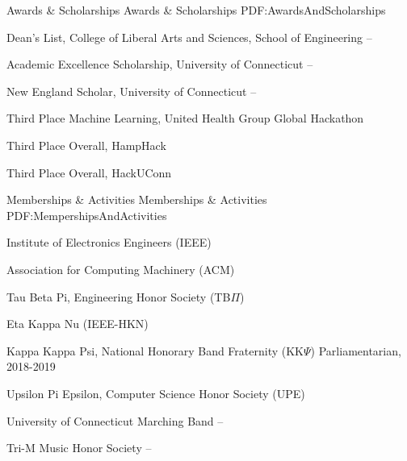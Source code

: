 \documentclass[letterpaper,MMMyyyy,nonstopmode]{simpleresumecv}
\begin{document}
\begin{Body}
\Section
{Awards \&\newline
Scholarships}
{Awards \& Scholarships}
{PDF:AwardsAndScholarships}

\BulletItem
Dean's List,
College of Liberal Arts and Sciences, School of Engineering
\hfill
{} --

\Gap
\BulletItem
Academic Excellence Scholarship, University of Connecticut
\hfill
{} -- 

\Gap
\BulletItem
New England Scholar, University of Connecticut
\hfill
{} -- 

\Gap
\BulletItem
Third Place Machine Learning, United Health Group Global Hackathon
\hfill
{}

\Gap
\BulletItem
Third Place Overall, HampHack
\hfill
{}

\Gap
\BulletItem
Third Place Overall, HackUConn
\hfill
{}


\Section
{Memberships\newline
\& Activities}
{Memberships \& Activities}
{PDF:MempershipsAndActivities}

\BulletItem
{Institute of Electronics Engineers (IEEE)}
\hfill
\Gap

\BulletItem
{Association for Computing Machinery (ACM)}
\hfill
\Gap

\BulletItem
{Tau Beta Pi, Engineering Honor Society (TB$\Pi$)}
\hfill
\Gap

\BulletItem
{Eta Kappa Nu (IEEE-HKN)}
\hfill
\Gap

\BulletItem
{Kappa Kappa Psi, National Honorary Band Fraternity (KK$\Psi$)}
\hfill
\SubBulletItem
{Parliamentarian, 2018-2019}
\Gap

\BulletItem
{Upsilon Pi Epsilon, Computer Science Honor Society (UPE)}
\hfill
\Gap

\BulletItem
{University of Connecticut Marching Band}
\hfill
{} -- 
\Gap

\BulletItem
{Tri-M Music Honor Society}
\hfill
{} -- 
\BigGap



\end{Body}
\end{document}

